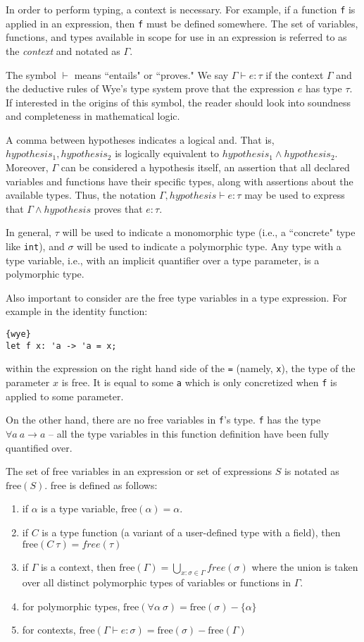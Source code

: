 \documentclass[a4paper, 12pt]{article}
\theoremstyle{myplain}
\theoremstyle{mydefinition}
\theoremstyle{myremark}
\numberwithin{equation} {section}
\numberwithin{figure}   {section}
\numberwithin{table}    {section}
\newcommand{\free}{\text{free}}
\begin{document}
In order to perform typing, a context is necessary. For example, if a function \texttt{f} is applied in an expression, then \texttt{f} must be defined somewhere. The set of variables, functions, and types available in scope for use in an expression is referred to as the \textit{context} and notated as $\Gamma$.

The symbol $\vdash$ means ``entails" or ``proves." We say $\Gamma\vdash e: \tau$ if the context $\Gamma$ and the deductive rules of Wye's type system prove that the expression $e$ has type $\tau$. If interested in the origins of this symbol, the reader should look into soundness and completeness in mathematical logic.

A comma between hypotheses indicates a logical and. That is, $hypothesis_1, hypothesis_2$ is logically equivalent to $hypothesis_1 \wedge hypothesis_2$. Moreover, $\Gamma$ can be considered a hypothesis itself, an assertion that all declared variables and functions have their specific types, along with assertions about the available types. Thus, the notation $\Gamma, hypothesis \vdash e: \tau$ may be used to express that $\Gamma \wedge hypothesis$ proves that $e: \tau$.

In general, $\tau$ will be used to indicate a monomorphic type (i.e., a ``concrete" type like \texttt{int}), and $\sigma$ will be used to indicate a polymorphic type. Any type with a type variable, i.e., with an implicit quantifier over a type parameter, is a polymorphic type.

Also important to consider are the free type variables in a type expression. For example in the identity function:
\begin{lstlisting}{wye}
let f x: 'a -> 'a = x;
\end{lstlisting}
within the expression on the right hand side of the \texttt{=} (namely, \texttt{x}), the type of the parameter $x$ is free. It is equal to some \texttt{a} which is only concretized when \texttt{f} is applied to some parameter.

On the other hand, there are no free variables in \texttt{f}'s type. \texttt{f} has the type $\forall a\: a\to a$ -- all the type variables in this function definition have been fully quantified over.

The set of free variables in an expression or set of expressions $S$ is notated as $\free(S)$. free is defined as follows:
\begin{enumerate}
\item if $\alpha$ is a type variable, $\free(\alpha) = \alpha$.
\item if $C$ is a type function (a variant of a user-defined type with a field), then $\free(C\: \tau) = free(\tau)$
\item if $\Gamma$ is a context, then $\free(\Gamma) = \bigcup_{x : \sigma\in\Gamma }free(\sigma)$ where the union is taken over all distinct polymorphic types of variables or functions in $\Gamma$.
\item for polymorphic types, $\free(\forall \alpha \: \sigma) = \free(\sigma) - \{\alpha\}$
\item for contexts, $\free(\Gamma\vdash e: \sigma) = \free(\sigma) - \free(\Gamma)$
\end{enumerate}
\end{document}
